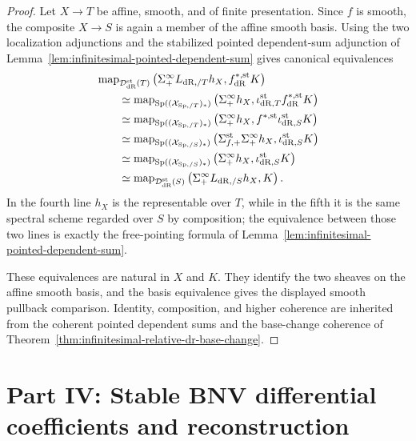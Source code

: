 \begin{proof}
Let $X\to T$ be affine, smooth, and of finite presentation.  Since $f$ is
smooth, the composite $X\to S$ is again a member of the affine smooth basis.
Using the two localization adjunctions and the stabilized pointed
dependent-sum adjunction of
Lemma~\ref{lem:infinitesimal-pointed-dependent-sum} gives canonical
equivalences
\[
\begin{aligned}
&\operatorname{map}_{\mathcal D_{\mathrm{dR}}^{\mathrm{st}}(T)}
 \left(
   \Sigma^\infty_+L_{\mathrm{dR},/T}h_X,
   f_{\mathrm{dR}}^{*,\mathrm{st}}K
 \right)
\\
&\qquad\simeq
 \operatorname{map}_{\operatorname{Sp}((\mathcal X_{\mathrm{Sp},/T})_*)}
 \left(
   \Sigma^\infty_+h_X,
   \iota_{\mathrm{dR},T}^{\mathrm{st}}f_{\mathrm{dR}}^{*,\mathrm{st}}K
 \right)
\\
&\qquad\simeq
 \operatorname{map}_{\operatorname{Sp}((\mathcal X_{\mathrm{Sp},/T})_*)}
 \left(
   \Sigma^\infty_+h_X,
   f^{*,\mathrm{st}}\iota_{\mathrm{dR},S}^{\mathrm{st}}K
 \right)
\\
&\qquad\simeq
 \operatorname{map}_{\operatorname{Sp}((\mathcal X_{\mathrm{Sp},/S})_*)}
 \left(
   \Sigma_{f,+}^{\mathrm{st}}\Sigma^\infty_+h_X,
   \iota_{\mathrm{dR},S}^{\mathrm{st}}K
 \right)
\\
&\qquad\simeq
 \operatorname{map}_{\operatorname{Sp}((\mathcal X_{\mathrm{Sp},/S})_*)}
 \left(
   \Sigma^\infty_+h_X,
   \iota_{\mathrm{dR},S}^{\mathrm{st}}K
 \right)
\\
&\qquad\simeq
 \operatorname{map}_{\mathcal D_{\mathrm{dR}}^{\mathrm{st}}(S)}
 \left(
   \Sigma^\infty_+L_{\mathrm{dR},/S}h_X,
   K
 \right).
\end{aligned}
\]
In the fourth line $h_X$ is the representable over $T$, while in the fifth it
is the same spectral scheme regarded over $S$ by composition; the equivalence
between those two lines is exactly the free-pointing formula of
Lemma~\ref{lem:infinitesimal-pointed-dependent-sum}.

These equivalences are natural in $X$ and $K$.  They identify the two sheaves
on the affine smooth basis, and the basis equivalence gives the displayed
smooth pullback comparison.  Identity, composition, and higher coherence are
inherited from the coherent pointed dependent sums and the base-change
coherence of
Theorem~\ref{thm:infinitesimal-relative-dr-base-change}.
\end{proof}

\section*{Part IV: Stable BNV differential coefficients and reconstruction}


